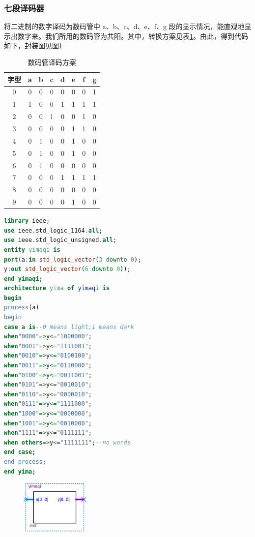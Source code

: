 \documentclass[12pt]{article}
\begin{document}
\subsubsection{七段译码器}将二进制的数字译码为数码管中 a、b、c、d、e、f、g 段的显示情况，能直观地显示出数字来。我们所用的数码管为共阳。其中，转换方案见表\ref{tab:yima}。由此，得到代码如下，封装图见图\ref{fig:yima}
\begin{table}[hp]
  \centering
  \caption{数码管译码方案}
    \begin{tabular}{cccccccc}
    \hline
字型 & a & b & c & d & e & f & g \\
\hline
0  & 0 & 0 & 0 & 0 & 0 & 0 & 1 \\
1  & 1 & 0 & 0 & 1 & 1 & 1 & 1 \\
2  & 0 & 0 & 1 & 0 & 0 & 1 & 0 \\
3  & 0 & 0 & 0 & 0 & 1 & 1 & 0 \\
4  & 0 & 1 & 0 & 0 & 1 & 0 & 0 \\
5  & 0 & 1 & 0 & 0 & 1 & 0 & 0 \\
6  & 0 & 1 & 0 & 0 & 0 & 0 & 0 \\
7  & 0 & 0 & 0 & 1 & 1 & 1 & 1 \\
8  & 0 & 0 & 0 & 0 & 0 & 0 & 0 \\
9  & 0 & 0 & 0 & 0 & 1 & 0 & 0\\
    \hline
    \end{tabular}%
  \label{tab:yima}%
\end{table}
\begin{lstlisting}[language=VHDL]
library ieee;
use ieee.std_logic_1164.all;
use ieee.std_logic_unsigned.all;
entity yimaqi is
port(a:in std_logic_vector(3 downto 0);
y:out std_logic_vector(6 downto 0));
end yimaqi;
architecture yima of yimaqi is
begin
process(a)
begin
case a is--0 means light;1 means dark
when"0000"=>y<="1000000";
when"0001"=>y<="1111001";
when"0010"=>y<="0100100";
when"0011"=>y<="0110000";
when"0100"=>y<="0011001";
when"0101"=>y<="0010010";
when"0110"=>y<="0000010";
when"0111"=>y<="1111000";
when"1000"=>y<="0000000";
when"1001"=>y<="0010000";
when"1111"=>y<="0111111";
when others=>y<="1111111";--no words
end case;
end process;
end yima;
\end{lstlisting}
\begin{figure}[hp]
	\centering  
	\includegraphics[width=0.3\textwidth]{picture/yima.png} 
	\caption{}
	\label{fig:yima}   
\end{figure}
\end{document}

